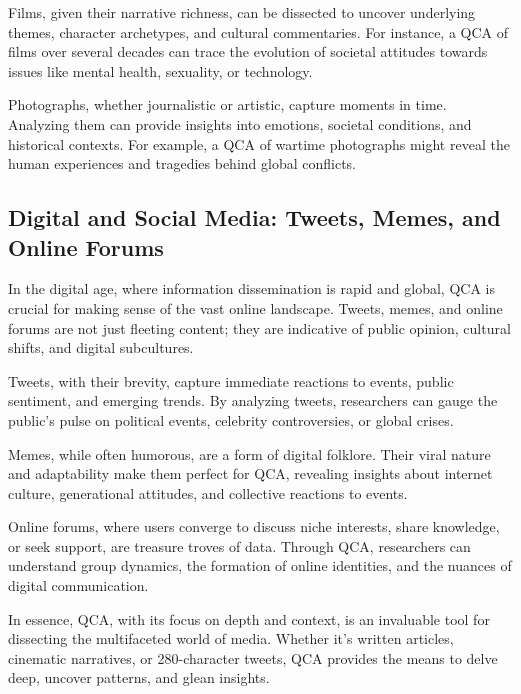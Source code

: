 \documentclass[
  b5paper]{book}
\begin{document}
Films, given their narrative richness, can be dissected to uncover underlying themes, character archetypes, and cultural commentaries. For instance, a QCA of films over several decades can trace the evolution of societal attitudes towards issues like mental health, sexuality, or technology.

Photographs, whether journalistic or artistic, capture moments in time. Analyzing them can provide insights into emotions, societal conditions, and historical contexts. For example, a QCA of wartime photographs might reveal the human experiences and tragedies behind global conflicts.

\hypertarget{digital-and-social-media-tweets-memes-and-online-forums}{%
\subsection*{Digital and Social Media: Tweets, Memes, and Online Forums}\label{digital-and-social-media-tweets-memes-and-online-forums}}

In the digital age, where information dissemination is rapid and global, QCA is crucial for making sense of the vast online landscape. Tweets, memes, and online forums are not just fleeting content; they are indicative of public opinion, cultural shifts, and digital subcultures.

Tweets, with their brevity, capture immediate reactions to events, public sentiment, and emerging trends. By analyzing tweets, researchers can gauge the public's pulse on political events, celebrity controversies, or global crises.

Memes, while often humorous, are a form of digital folklore. Their viral nature and adaptability make them perfect for QCA, revealing insights about internet culture, generational attitudes, and collective reactions to events.

Online forums, where users converge to discuss niche interests, share knowledge, or seek support, are treasure troves of data. Through QCA, researchers can understand group dynamics, the formation of online identities, and the nuances of digital communication.

In essence, QCA, with its focus on depth and context, is an invaluable tool for dissecting the multifaceted world of media. Whether it's written articles, cinematic narratives, or 280-character tweets, QCA provides the means to delve deep, uncover patterns, and glean insights.
\end{document}
